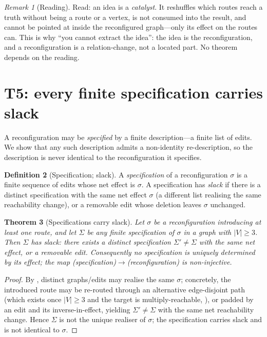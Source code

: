 \documentclass[11pt,a4paper]{article}
\theoremstyle{thmstyle}
\newtheorem{theorem}{Theorem}[section]
\theoremstyle{definition}
\newtheorem{definition}[theorem]{Definition}
\theoremstyle{remark}
\newtheorem{remark}[theorem]{Remark}
\newcommand{\V}{V}
\newcommand{\reshuffle}{\sigma}    %
\newcommand{\abs}[1]{\lvert#1\rvert}
\begin{document}
\begin{remark}[Reading]
\label{rem:catalyst-read}
Read: an idea is a \emph{catalyst}. It reshuffles which routes reach a truth
without being a route or a vertex, is not consumed into the result, and
cannot be pointed at inside the reconfigured graph---only its effect on the
routes can. This is why ``you cannot extract the idea'': the idea is the
reconfiguration, and a reconfiguration is a relation-change, not a located
part. No theorem depends on the reading.
\end{remark}

\section{T5: every finite specification carries slack}
\label{sec:slack}

A reconfiguration may be \emph{specified} by a finite description---a finite
list of edits. We show that any such description admits a non-identity
re-description, so the description is never identical to the reconfiguration
it specifies.

\begin{definition}[Specification; slack]
\label{def:spec}
A \emph{specification} of a reconfiguration $\reshuffle$ is a finite sequence
of edits whose net effect is $\reshuffle$. A specification has \emph{slack}
if there is a distinct specification with the same net effect $\reshuffle$
(a different list realising the same reachability change), or a removable
edit whose deletion leaves $\reshuffle$ unchanged.
\end{definition}

\begin{theorem}[Specifications carry slack]
\label{thm:slack}
Let $\reshuffle$ be a reconfiguration introducing at least one route, and let
$\Sigma$ be any finite specification of $\reshuffle$ in a graph with
$\abs{\V}\ge3$. Then $\Sigma$ has slack: there exists a distinct
specification $\Sigma'\neq\Sigma$ with the same net effect, or a removable
edit. Consequently no specification is uniquely determined by its effect;
the map (specification)$\to$(reconfiguration) is non-injective.
\end{theorem}

\begin{proof}
By , distinct graphs/edits may realise the same
$\reshuffle$; concretely, the introduced route may be re-routed through an
alternative edge-disjoint path (which exists once $\abs{\V}\ge3$ and the
target is multiply-reachable, ), or padded by an edit and
its inverse-in-effect, yielding $\Sigma'\neq\Sigma$ with the same net
reachability change. Hence $\Sigma$ is not the unique realiser of
$\reshuffle$; the specification carries slack and is not identical to
$\reshuffle$.
\end{proof}
\end{document}
